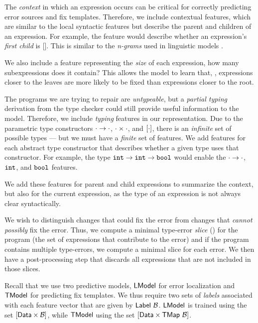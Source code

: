 The \emph{context} in which an expression occurs can be critical for correctly
predicting error sources and fix templates. Therefore, we include contextual
features, which are similar to the local syntactic features but describe the
parent and children of an expression. For example, the \IsNilC feature
would describe whether an expression's \emph{first child} is []. This
is similar
to the \emph{n-grams} used in linguistic models
\citep{Hindle2012-hf,Gabel2010-el}.

We also include a feature representing the \emph{size} of each expression, \ie
how many subexpressions does it contain? This allows the model to learn that,
\eg, expressions closer to the leaves are more likely to be fixed than
expressions closer to the root.

The programs we are trying to repair are \emph{untypeable}, but a \emph{partial
typing} derivation from the type checker could still provide useful information
to the model. Therefore, we include \emph{typing} features in our
representation. Due to the parametric type constructors
$\cdot \to \cdot$, $\cdot \times \cdot$, and $[\cdot]$, there is an
\emph{infinite} set of possible types --- but we must have a \emph{finite} set
of features. We add features for each abstract type constructor that describes whether a
given type uses that constructor. For example, the type
$\mathtt{int} \to \mathtt{int} \to \mathtt{bool}$
would enable the $\cdot \to \cdot$, $\mathtt{int}$, and $\mathtt{bool}$ features.

We add these features for parent and child expressions to summarize the context,
but also for the current expression, as the type of an expression is not always
clear syntactically.

We wish to distinguish changes that could fix the error
from changes that \emph{cannot possibly} fix the error. Thus, we compute a
minimal type-error \emph{slice} (\eg \citep{Tip2001-qp,Haack2003-vc}) for the
program (\ie the set of expressions that contribute to the error) and if the
program contains multiple type-errors, we compute a minimal slice for each
error. We then have a post-processing step that discards all expressions that
are not included in those slices.

Recall that we use two predictive models, $\mathsf{LModel}$ for error localization and
$\mathsf{TModel}$ for predicting fix templates. We thus require two sets of
\emph{labels} associated with each feature vector that are given by
$\mathsf{Label}\ \mathcal{B}$. $\mathsf{LModel}$ is trained using the set $[\mathsf{Data} \times
\mathcal{B}]$, while $\mathsf{TModel}$ using the set $[\mathsf{Data} \times
\mathsf{TMap}\ \mathcal{B}]$.

